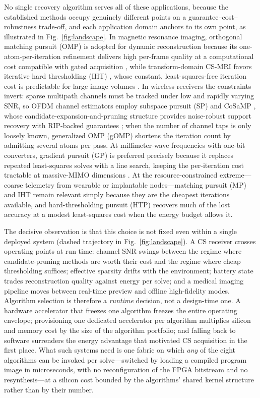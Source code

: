 No single recovery algorithm serves all of these applications, because the
established methods occupy genuinely different points on a
guarantee--cost--robustness trade-off, and each application domain anchors
to its own point, as illustrated in Fig.~\ref{fig:landscape}. In magnetic resonance imaging, orthogonal matching pursuit
(OMP) \cite{tropp2007omp} is adopted for dynamic reconstruction because its
one-atom-per-iteration refinement delivers high per-frame quality at a
computational cost compatible with gated acquisition \cite{usman2011omp_mri},
while transform-domain CS-MRI favors iterative hard thresholding (IHT)
\cite{blumensath2009iht}, whose constant, least-squares-free iteration cost
is predictable for large image volumes \cite{qu2010iht_mri}. In wireless
receivers the constraints invert: sparse multipath channels must be tracked
under low and rapidly varying SNR, so OFDM channel estimators employ
subspace pursuit (SP) \cite{dai2009sp} and CoSaMP \cite{needell2009cosamp},
whose candidate-expansion-and-pruning structure provides noise-robust
support recovery with RIP-backed guarantees \cite{wu2010sp_ofdm}; when the
number of channel taps is only loosely known, generalized OMP (gOMP)
\cite{wang2012gomp} shortens the iteration count by admitting several atoms
per pass. At millimeter-wave frequencies with one-bit converters, gradient
pursuit (GP) \cite{blumensath2008gp} is preferred precisely because it
replaces repeated least-squares solves with a line search, keeping the
per-iteration cost tractable at massive-MIMO dimensions
\cite{kim2019gp_mmwave}. At the resource-constrained extreme---coarse
telemetry from wearable or implantable nodes---matching pursuit (MP)
\cite{mallat1993mp} and IHT remain relevant simply because they are the
cheapest iterations available, and hard-thresholding pursuit (HTP)
\cite{foucart2011htp} recovers much of the lost accuracy at a modest
least-squares cost when the energy budget allows it.

The decisive observation is that this choice is not fixed even within a
single deployed system (dashed trajectory in Fig.~\ref{fig:landscape}). A CS
receiver crosses operating points at run time:
channel SNR swings between the regime where candidate-pruning methods are
worth their cost and the regime where cheap thresholding suffices; effective
sparsity drifts with the environment; battery state trades reconstruction
quality against energy per solve; and a medical imaging pipeline moves
between real-time preview and offline high-fidelity modes. Algorithm
selection is therefore a \emph{runtime} decision, not a design-time one. A
hardware accelerator that freezes one algorithm freezes the entire operating
envelope; provisioning one dedicated accelerator per algorithm multiplies
silicon and memory cost by the size of the algorithm portfolio; and falling
back to software surrenders the energy advantage that motivated CS
acquisition in the first place. What such systems need is one fabric on
which \emph{any} of the eight algorithms can be invoked per solve---switched
by loading a compiled program image in microseconds, with no
reconfiguration of the FPGA bitstream and no resynthesis---at a silicon
cost bounded by the algorithms' shared kernel structure rather than by
their number.

